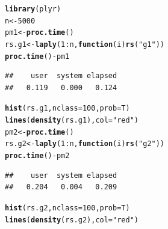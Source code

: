 \documentclass{article}\usepackage[]{graphicx}\usepackage[]{color}
\makeatletter
\newcommand{\hlnum}[1]{\textcolor[rgb]{0.686,0.059,0.569}{#1}}%
\newcommand{\hlstr}[1]{\textcolor[rgb]{0.192,0.494,0.8}{#1}}%
\newcommand{\hlopt}[1]{\textcolor[rgb]{0,0,0}{#1}}%
\newcommand{\hlstd}[1]{\textcolor[rgb]{0.345,0.345,0.345}{#1}}%
\newcommand{\hlkwa}[1]{\textcolor[rgb]{0.161,0.373,0.58}{\textbf{#1}}}%
\newcommand{\hlkwb}[1]{\textcolor[rgb]{0.69,0.353,0.396}{#1}}%
\newcommand{\hlkwc}[1]{\textcolor[rgb]{0.333,0.667,0.333}{#1}}%
\newcommand{\hlkwd}[1]{\textcolor[rgb]{0.737,0.353,0.396}{\textbf{#1}}}%
\newenvironment{kframe}{%
 \def\at@end@of@kframe{}%
 \ifinner\ifhmode%
  \def\at@end@of@kframe{\end{minipage}}%
  \begin{minipage}{\columnwidth}%
 \fi\fi%
 \def\FrameCommand##1{\hskip\@totalleftmargin \hskip-\fboxsep
 \colorbox{shadecolor}{##1}\hskip-\fboxsep
     \hskip-\linewidth \hskip-\@totalleftmargin \hskip\columnwidth}%
 \MakeFramed {\advance\hsize-\width
   \@totalleftmargin\z@ \linewidth\hsize
   \@setminipage}}%
 {\par\unskip\endMakeFramed%
 \at@end@of@kframe}
\newenvironment{knitrout}{}{} %
\makeatother
\begin{document}
\begin{itemize}
\begin{knitrout}
\begin{kframe}
\begin{alltt}
\hlkwd{library}\hlstd{(plyr)}
\hlstd{n} \hlkwb{<-} \hlnum{5000}
\hlstd{pm1} \hlkwb{<-} \hlkwd{proc.time}\hlstd{()}
\hlstd{rs.g1} \hlkwb{<-} \hlkwd{laply}\hlstd{(}\hlnum{1}\hlopt{:}\hlstd{n,} \hlkwa{function}\hlstd{(}\hlkwc{i}\hlstd{)}\hlkwd{rs}\hlstd{(}\hlstr{"g1"}\hlstd{))}
\hlkwd{proc.time}\hlstd{()}\hlopt{-}\hlstd{pm1}
\end{alltt}
\begin{verbatim}
##    user  system elapsed 
##   0.119   0.000   0.124
\end{verbatim}
\begin{alltt}
\hlkwd{hist}\hlstd{(rs.g1,} \hlkwc{nclass} \hlstd{=} \hlnum{100}\hlstd{,} \hlkwc{prob} \hlstd{= T)}
\hlkwd{lines}\hlstd{(}\hlkwd{density}\hlstd{(rs.g1),} \hlkwc{col} \hlstd{=} \hlstr{"red"}\hlstd{)}
\hlstd{pm2} \hlkwb{<-} \hlkwd{proc.time}\hlstd{()}
\hlstd{rs.g2} \hlkwb{<-} \hlkwd{laply}\hlstd{(}\hlnum{1}\hlopt{:}\hlstd{n,} \hlkwa{function}\hlstd{(}\hlkwc{i}\hlstd{)}\hlkwd{rs}\hlstd{(}\hlstr{"g2"}\hlstd{))}
\hlkwd{proc.time}\hlstd{()}\hlopt{-}\hlstd{pm2}
\end{alltt}
\begin{verbatim}
##    user  system elapsed 
##   0.204   0.004   0.209
\end{verbatim}
\begin{alltt}
\hlkwd{hist}\hlstd{(rs.g2,} \hlkwc{nclass} \hlstd{=} \hlnum{100}\hlstd{,} \hlkwc{prob} \hlstd{= T)}
\hlkwd{lines}\hlstd{(}\hlkwd{density}\hlstd{(rs.g2),} \hlkwc{col} \hlstd{=} \hlstr{"red"}\hlstd{)}
\end{alltt}
\end{kframe}


\end{knitrout}
\end{itemize}
\end{document}
